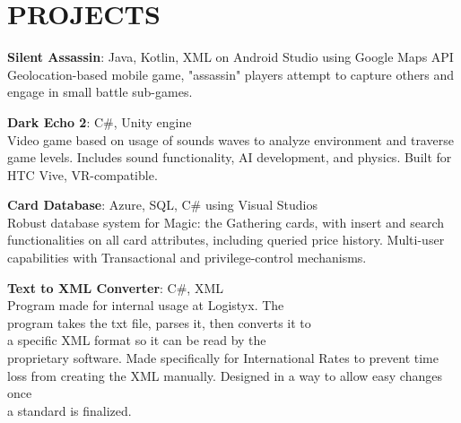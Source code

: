 \documentclass[10.99pt]{article}
\begin{document}
\section*{PROJECTS}
\noindent\makebox[\linewidth]{\rule{7.2in}{0.4pt}} 
\vspace{-2.25em}
\begin{minipage}[t]{0.5\textwidth}
\raggedright
\textbf{Silent Assassin}: Java, Kotlin, XML on Android Studio using Google Maps API
\\Geolocation-based mobile game, "assassin" players attempt to capture others and engage in small battle sub-games.
\vspace{1em}
\end{minipage}
\hspace{1em}
\begin{minipage}[t]{0.5\textwidth}
\raggedright
\textbf{Dark Echo 2}: C\#, Unity engine
\\Video game based on usage of sounds waves to analyze environment and traverse game levels. Includes sound functionality, AI development, and physics. Built for 
\\HTC Vive, VR-compatible.
\vspace{1em}
\end{minipage}
\begin{minipage}[t]{0.5\textwidth}
\vspace{2.0em}
\raggedright
\textbf{Card Database}: Azure, SQL, C\# using Visual Studios
\\Robust database system for Magic: the Gathering cards, with insert and search functionalities on all card attributes, including queried price history. Multi-user capabilities with Transactional and privilege-control mechanisms.
\end{minipage}
\hspace{1em}
\begin{minipage}[t]{0.5\textwidth}
\vspace{2.0em}
\raggedright
\textbf{Text to XML Converter}: C\#, XML
\\Program made for internal usage at Logistyx. The 
\\program takes the txt file, parses it, then converts it to 
\\a specific XML format so it can be read by the 
\\proprietary software. Made specifically for International Rates to prevent time loss from creating the XML manually. Designed in a way to allow easy changes once 
\\a standard is finalized.
\end{minipage}
\end{document}
